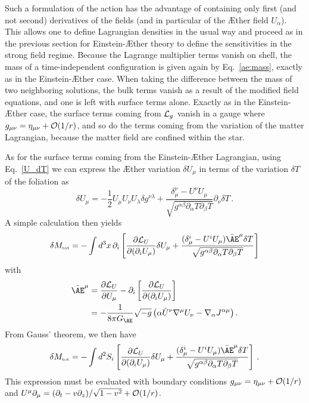 \documentclass[prd,aps,twocolumn,nofootinbib,showpacs,superscriptaddress]{revtex4-1}
\newcommand\be{\begin{equation}}
\newcommand\ee{\end{equation}}
\newcommand{\nn}{\nonumber}
\newcommand{\tot}{{\mbox{\tiny tot}}}
\begin{document}
Such a formulation of the action has the advantage of containing only first
(and not second) derivatives of the fields (and in particular of the \AE ther field $U_\alpha$). This allows one to
define Lagrangian densities in the usual way and proceed as in the previous section for Einstein-\AE ther theory 
to define the sensitivities in the strong field regime. Because
the Lagrange multiplier terms vanish on shell, the mass of a
time-independent configuration is given again by Eq.~\eqref{ae:mass},
exactly as in the Einstein-\AE ther case. When taking the difference
between the mass of two neighboring solutions, the bulk terms vanish
as a result of the modified field equations, and one is left with
surface terms alone. Exactly as in the Einstein-\AE ther case, the
surface terms coming from ${\cal L}_{g_{{}}}$ vanish in a gauge
where $g_{\mu\nu}=\eta_{\mu\nu}+{\cal O}(1/r)$, and so do the terms
coming from the variation of the matter Lagrangian, because the matter 
field are confined within the star.

As for the surface terms coming from the Einstein-\AE ther Lagrangian,
using Eq.~\eqref{U_dT} we can express the \AE ther variation $\delta U_\mu$ in
terms of the variation $\delta T$ of the foliation as
%
\be \delta U_\mu= -\frac{1}{2} U_\mu U_\nu U_\lambda \delta
g^{\nu\lambda} +\frac{\delta^\nu_\mu -U^\nu U_\mu}{\sqrt{g^{\alpha\beta}\partial_\alpha T
    \partial_\beta T}} \partial_\nu \delta T\,.  \ee
%
A simple calculation then yields
%
\be \delta M_{\tot} = - \int d^3 x\, \partial_i \left[ \frac{\partial {\cal
      L}_{U}}{\partial (\partial_i U_\mu)} \delta U_\mu+
  \frac{(\delta^i_\mu -U^i U_\mu)  \bar{\AE}^\mu \delta
    T}{\sqrt{g^{\alpha\beta}\partial_\alpha T \partial_\beta T}}
  \right] \ee
%
with 
%
\begin{align}
\bar{\AE}^\mu&=\frac{\partial {\cal L}_{U}}{\partial
  U_\mu}-\partial_i\left[\frac{\partial {\cal L}_{U}}{\partial
    (\partial_i U_\mu)}\right]\,\nn \\&=-\frac{1}{8 \pi G_{\AE}} \sqrt{-g}
\left(\alpha \dot{U}^\nu \nabla^\mu U_\nu-\nabla_\alpha J^{\alpha \mu}\right).
\end{align}
%
From Gauss' theorem, we then have 
\begin{equation}
\delta M_{\tot} = - \int d^2S_i \left[ \frac{\partial {\cal L}_{U}}{\partial
    (\partial_i U_\mu)} \delta U_\mu+ \frac{(\delta^i_\mu -U^i U_\mu)
    \bar{\AE}^\mu \delta T}{\sqrt{g^{\alpha\beta}\partial_\alpha T
      \partial_\beta T}}  \right]\,. \label{surfaceIntHL}
\end{equation}
This expression must be evaluated with boundary conditions
$g_{\mu\nu}=\eta_{\mu\nu}+{\cal O}(1/r)$
and $U^{\mu}\partial_\mu=
(\partial_t-v \partial_z)/\sqrt{1-v^2} +{\cal O}(1/r)$.
\end{document}
